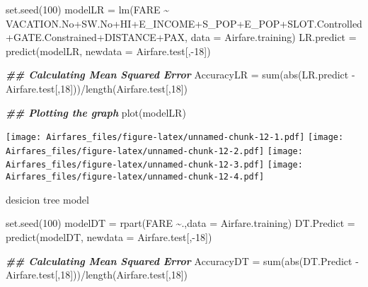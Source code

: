\documentclass[]{article}
\newenvironment{Shaded}{\begin{snugshade}}{\end{snugshade}}
\newcommand{\AttributeTok}[1]{\textcolor[rgb]{0.77,0.63,0.00}{#1}}
\newcommand{\DecValTok}[1]{\textcolor[rgb]{0.00,0.00,0.81}{#1}}
\newcommand{\DocumentationTok}[1]{\textcolor[rgb]{0.56,0.35,0.01}{\textbf{\textit{#1}}}}
\newcommand{\FunctionTok}[1]{\textcolor[rgb]{0.00,0.00,0.00}{#1}}
\newcommand{\NormalTok}[1]{#1}
\newcommand{\OtherTok}[1]{\textcolor[rgb]{0.56,0.35,0.01}{#1}}
\newcommand{\SpecialCharTok}[1]{\textcolor[rgb]{0.00,0.00,0.00}{#1}}
\begin{document}
\begin{Shaded}
\begin{Highlighting}[]
\FunctionTok{set.seed}\NormalTok{(}\DecValTok{100}\NormalTok{)}
\NormalTok{modelLR }\OtherTok{=} \FunctionTok{lm}\NormalTok{(FARE }\SpecialCharTok{\textasciitilde{}}\NormalTok{ VACATION.No}\SpecialCharTok{+}\NormalTok{SW.No}\SpecialCharTok{+}\NormalTok{HI}\SpecialCharTok{+}\NormalTok{E\_INCOME}\SpecialCharTok{+}\NormalTok{S\_POP}\SpecialCharTok{+}\NormalTok{E\_POP}\SpecialCharTok{+}\NormalTok{SLOT.Controlled}\SpecialCharTok{+}\NormalTok{GATE.Constrained}\SpecialCharTok{+}\NormalTok{DISTANCE}\SpecialCharTok{+}\NormalTok{PAX, }\AttributeTok{data =}\NormalTok{ Airfare.training)}
\NormalTok{LR.predict }\OtherTok{=} \FunctionTok{predict}\NormalTok{(modelLR, }\AttributeTok{newdata =}\NormalTok{ Airfare.test[,}\SpecialCharTok{{-}}\DecValTok{18}\NormalTok{])}

\DocumentationTok{\#\# Calculating Mean Squared Error}
\NormalTok{AccuracyLR }\OtherTok{=} \FunctionTok{sum}\NormalTok{(}\FunctionTok{abs}\NormalTok{(LR.predict }\SpecialCharTok{{-}}\NormalTok{ Airfare.test[,}\DecValTok{18}\NormalTok{]))}\SpecialCharTok{/}\FunctionTok{length}\NormalTok{(Airfare.test[,}\DecValTok{18}\NormalTok{])}

\DocumentationTok{\#\# Plotting the graph}
\FunctionTok{plot}\NormalTok{(modelLR)}
\end{Highlighting}
\end{Shaded}

\texttt{[image: Airfares\_files/figure-latex/unnamed-chunk-12-1.pdf]}
\texttt{[image: Airfares\_files/figure-latex/unnamed-chunk-12-2.pdf]}
\texttt{[image: Airfares\_files/figure-latex/unnamed-chunk-12-3.pdf]}
\texttt{[image: Airfares\_files/figure-latex/unnamed-chunk-12-4.pdf]}

desicion tree model

\begin{Shaded}
\begin{Highlighting}[]
\FunctionTok{set.seed}\NormalTok{(}\DecValTok{100}\NormalTok{)}
\NormalTok{modelDT }\OtherTok{=} \FunctionTok{rpart}\NormalTok{(FARE }\SpecialCharTok{\textasciitilde{}}\NormalTok{.,}\AttributeTok{data =}\NormalTok{ Airfare.training)}
\NormalTok{DT.Predict }\OtherTok{=} \FunctionTok{predict}\NormalTok{(modelDT, }\AttributeTok{newdata =}\NormalTok{ Airfare.test[,}\SpecialCharTok{{-}}\DecValTok{18}\NormalTok{])}

\DocumentationTok{\#\# Calculating Mean Squared Error       }
\NormalTok{AccuracyDT }\OtherTok{=} \FunctionTok{sum}\NormalTok{(}\FunctionTok{abs}\NormalTok{(DT.Predict }\SpecialCharTok{{-}}\NormalTok{ Airfare.test[,}\DecValTok{18}\NormalTok{]))}\SpecialCharTok{/}\FunctionTok{length}\NormalTok{(Airfare.test[,}\DecValTok{18}\NormalTok{]) }
\end{Highlighting}
\end{Shaded}
\end{document}
